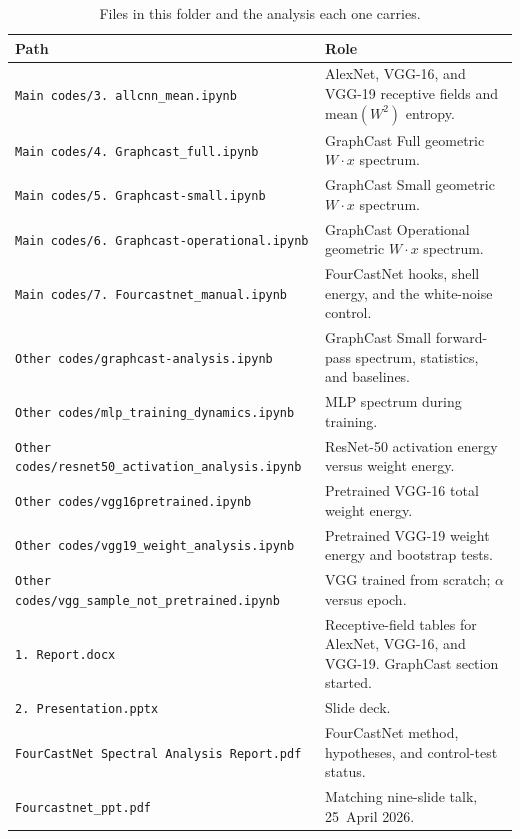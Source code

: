 \documentclass[11pt,a4paper]{article}
\begin{document}
\begin{table}[ht]
  \centering
  \caption{Files in this folder and the analysis each one carries.}
  \label{tab:files}
  \small
  \begin{tabularx}{\textwidth}{lX}
    \toprule
    Path & Role \\
    \midrule
    \texttt{Main codes/3. allcnn\_mean.ipynb}
      & AlexNet, VGG-16, and VGG-19 receptive fields and \(\mathrm{mean}(W^2)\) entropy. \\
    \texttt{Main codes/4. Graphcast\_full.ipynb}
      & GraphCast Full geometric \(W\cdot x\) spectrum. \\
    \texttt{Main codes/5. Graphcast-small.ipynb}
      & GraphCast Small geometric \(W\cdot x\) spectrum. \\
    \texttt{Main codes/6. Graphcast-operational.ipynb}
      & GraphCast Operational geometric \(W\cdot x\) spectrum. \\
    \texttt{Main codes/7. Fourcastnet\_manual.ipynb}
      & FourCastNet hooks, shell energy, and the white-noise control. \\
    \texttt{Other codes/graphcast-analysis.ipynb}
      & GraphCast Small forward-pass spectrum, statistics, and baselines. \\
    \texttt{Other codes/mlp\_training\_dynamics.ipynb}
      & MLP spectrum during training. \\
    \texttt{Other codes/resnet50\_activation\_analysis.ipynb}
      & ResNet-50 activation energy versus weight energy. \\
    \texttt{Other codes/vgg16pretrained.ipynb}
      & Pretrained VGG-16 total weight energy. \\
    \texttt{Other codes/vgg19\_weight\_analysis.ipynb}
      & Pretrained VGG-19 weight energy and bootstrap tests. \\
    \texttt{Other codes/vgg\_sample\_not\_pretrained.ipynb}
      & VGG trained from scratch; \(\alpha\) versus epoch. \\
    \texttt{1. Report.docx}
      & Receptive-field tables for AlexNet, VGG-16, and VGG-19. GraphCast section started. \\
    \texttt{2. Presentation.pptx}
      & Slide deck. \\
    \texttt{FourCastNet Spectral Analysis Report.pdf}
      & FourCastNet method, hypotheses, and control-test status. \\
    \texttt{Fourcastnet\_ppt.pdf}
      & Matching nine-slide talk, 25~April 2026. \\
    \bottomrule
  \end{tabularx}
\end{table}
\end{document}
